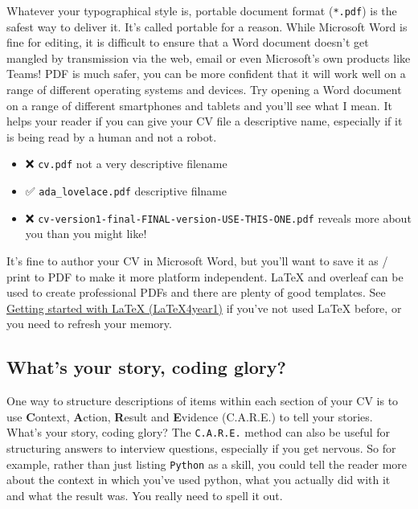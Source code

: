 \documentclass[
]{book}
\providecommand{\tightlist}{%
  \setlength{\itemsep}{0pt}\setlength{\parskip}{0pt}}
\begin{document}
Whatever your typographical style is, portable document format (\texttt{*.pdf}) is the safest way to deliver it. It's called portable for a reason. While Microsoft Word is fine for editing, it is difficult to ensure that a Word document doesn't get mangled by transmission via the web, email or even Microsoft's own products like Teams! PDF is much safer, you can be more confident that it will work well on a range of different operating systems and devices. Try opening a Word document on a range of different smartphones and tablets and you'll see what I mean. It helps your reader if you can give your CV file a descriptive name, especially if it is being read by a human and not a robot. 🤖

\begin{itemize}
\tightlist
\item
  ❌ \texttt{cv.pdf} not a very descriptive filename
\item
  ✅ \texttt{ada\_lovelace.pdf} descriptive filname
\item
  ❌ \texttt{cv-version1-final-FINAL-version-USE-THIS-ONE.pdf} reveals more about you than you might like!
\end{itemize}

It's fine to author your CV in Microsoft Word, but you'll want to save it as / print to PDF to make it more platform independent. LaTeX and overleaf can be used to create professional PDFs and there are plenty of good templates. See \href{https://latex4year1.netlify.app/}{Getting started with LaTeX (LaTeX4year1)} if you've not used LaTeX before, or you need to refresh your memory. \citep{latex4year1}

\hypertarget{care}{%
\subsection{What's your story, coding glory?}\label{care}}

One way to structure descriptions of items within each section of your CV is to use \textbf{C}ontext, \textbf{A}ction, \textbf{R}esult and \textbf{E}vidence (C.A.R.E.) to tell your stories. What's your story, coding glory? \citep{whatsthestory} The \texttt{C.A.R.E.} method can also be useful for structuring answers to interview questions, especially if you get nervous. So for example, rather than just listing \texttt{Python} as a skill, you could tell the reader more about the context in which you've used python, what you actually did with it and what the result was. You really need to spell it out.
\end{document}
